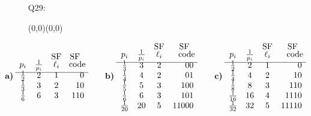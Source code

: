 \documentclass[11pt]{article}
\newcommand{\moveup}{\begin{picture}(0,0)(0,0)\end{picture}\vspace*{-8.15mm}}
\begin{document}
\newpage{}
\begin{itemize}
  \item[{Q29:}]\moveup
      \[\hspace*{-10mm}\textbf{a)}\:
        \begin{array}{cccr}
                    &               & \text{SF} & \text{SF\;\:}\\[-1mm]
           p_i      & \frac{1}{p_i} & \ell_i &\!\text{code}\!\\[1mm]\hline\\[-5mm]
        \frac{1}{2} &     2         &   1    &   0\\
        \frac{1}{3} &     3         &   2    &  10\\
        \frac{1}{6} &     6         &   3    & 110\end{array}\qquad
        \textbf{b)}\:
        \begin{array}{cccr}
                    &               & \text{SF} & \text{SF\;\:}\\[-1mm]
           p_i      & \frac{1}{p_i} & \ell_i    &\!\text{code}\!\\[1mm]\hline\\[-5mm]
        \frac{1}{3} &     3         &   2       &    00\\
        \frac{1}{4} &     4         &   2       &    01\\
        \frac{1}{5} &     5         &   3       &   100\\
        \frac{1}{6} &     6         &   3       &   101\\
        \frac{1}{20}&    20         &   5       & 11000\end{array}\qquad
        \textbf{c)}\:
        \begin{array}{cccr}
                    &               & \text{SF} & \text{SF\;\:}\\[-1mm]
           p_i      & \frac{1}{p_i} & \ell_i    &\!\text{code}\!\\[1mm]\hline\\[-5mm]
        \frac{1}{2} &     2         &    1      &     0\\
        \frac{1}{4} &     4         &    2      &    10\\
        \frac{1}{8} &     8         &    3      &   110\\
        \frac{1}{16}&    16         &    4      &  1110\\
        \frac{1}{32}&    32         &    5      & 11110\end{array}\qquad
\]
\end{itemize}
\end{document}
